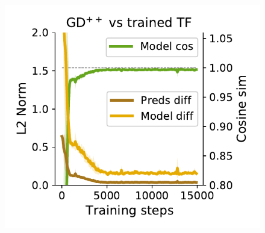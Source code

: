 \documentclass{article}
\theoremstyle{plain}
\theoremstyle{definition}
\theoremstyle{remark}
\begin{document}
\begin{figure}
\begin{center}
\begin{minipage}{.30\textwidth}
\begin{center}
  \end{center}
  \vspace{-10pt}
\end{minipage}
\begin{minipage}{.30\textwidth}
  \centering
  \begin{center}
    \includegraphics[width=1.\textwidth]{Final_figures/linear/ten_layers_rec/sim_4.pdf}
  \end{center}
  \vspace{-10pt}
\end{minipage}
\end{center}


\end{figure}
\end{document}

